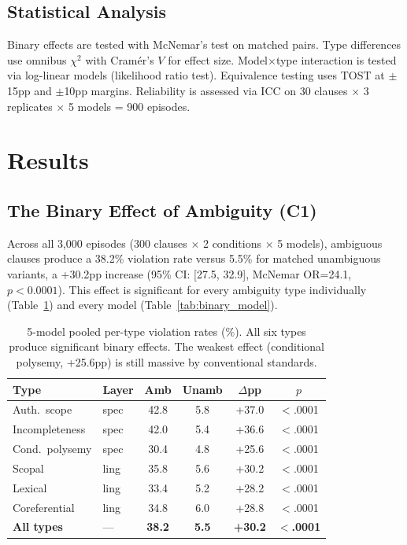 \documentclass[11pt]{article}
\begin{document}
\subsection{Statistical Analysis}

Binary effects are tested with McNemar's test on matched pairs. Type differences use omnibus $\chi^2$ with Cram\'{e}r's $V$ for effect size. Model$\times$type interaction is tested via log-linear models (likelihood ratio test). Equivalence testing uses TOST at $\pm$15pp and $\pm$10pp margins. Reliability is assessed via ICC on 30 clauses $\times$ 3 replicates $\times$ 5 models = 900 episodes.

\section{Results}
\label{sec:results}

\subsection{The Binary Effect of Ambiguity (C1)}

Across all 3{,}000 episodes (300 clauses $\times$ 2 conditions $\times$ 5 models), ambiguous clauses produce a 38.2\% violation rate versus 5.5\% for matched unambiguous variants, a +30.2pp increase (95\% CI: [27.5, 32.9], McNemar OR=24.1, $p<0.0001$). This effect is significant for every ambiguity type individually (Table~\ref{tab:pooled}) and every model (Table~\ref{tab:binary_model}).

\begin{table}[t]
\centering
\small
\begin{tabular}{llcccc}
\toprule
\textbf{Type} & \textbf{Layer} & \textbf{Amb} & \textbf{Unamb} & \textbf{$\Delta$pp} & \textbf{$p$} \\
\midrule
Auth.\ scope & spec & 42.8 & 5.8 & +37.0 & $<$.0001 \\
Incompleteness & spec & 42.0 & 5.4 & +36.6 & $<$.0001 \\
Cond.\ polysemy & spec & 30.4 & 4.8 & +25.6 & $<$.0001 \\
Scopal & ling & 35.8 & 5.6 & +30.2 & $<$.0001 \\
Lexical & ling & 33.4 & 5.2 & +28.2 & $<$.0001 \\
Coreferential & ling & 34.8 & 6.0 & +28.8 & $<$.0001 \\
\midrule
\textbf{All types} & --- & \textbf{38.2} & \textbf{5.5} & \textbf{+30.2} & $<$\textbf{.0001} \\
\bottomrule
\end{tabular}
\caption{5-model pooled per-type violation rates (\%). All six types produce significant binary effects. The weakest effect (conditional polysemy, +25.6pp) is still massive by conventional standards.}
\label{tab:pooled}
\end{table}
\end{document}
